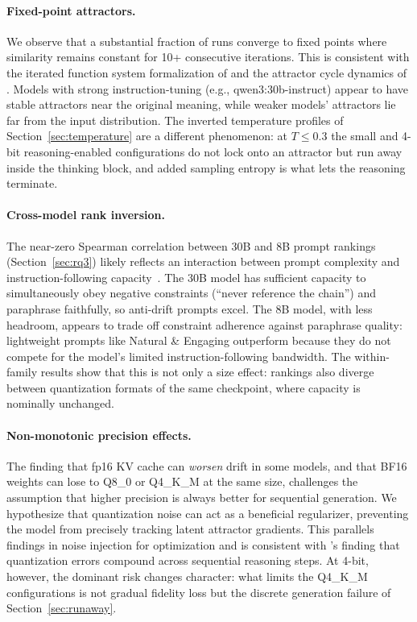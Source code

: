 \documentclass[11pt]{article}
\begin{document}
\paragraph{Fixed-point attractors.}
We observe that a substantial fraction of runs converge to fixed points where
similarity remains constant for 10+ consecutive iterations. This is consistent
with the iterated function system formalization of \citet{chytas2025concept}
and the attractor cycle dynamics of \citet{wang2025attractor}. Models with
strong instruction-tuning (e.g., qwen3:30b-instruct) appear to have stable
attractors near the original meaning, while weaker models' attractors lie
far from the input distribution. The inverted temperature profiles of
Section~\ref{sec:temperature} are a different phenomenon: at $T\leq0.3$ the
small and 4-bit reasoning-enabled configurations do not lock onto an
attractor but run away inside the thinking block, and added sampling entropy
is what lets the reasoning terminate.

\paragraph{Cross-model rank inversion.}
The near-zero Spearman correlation between 30B and 8B prompt rankings
(Section~\ref{sec:rq3}) likely reflects an interaction between prompt complexity
and instruction-following capacity~\citep{jaroslawicz2025ifscale}. The 30B model
has sufficient capacity to simultaneously obey negative constraints (``never
reference the chain'') and paraphrase faithfully, so anti-drift prompts excel.
The 8B model, with less headroom, appears to trade off constraint adherence
against paraphrase quality: lightweight prompts like Natural \& Engaging
outperform because they do not compete for the model's limited
instruction-following bandwidth. The within-family results show that this is not
only a size effect: rankings also diverge between quantization formats of the
same checkpoint, where capacity is nominally unchanged.

\paragraph{Non-monotonic precision effects.}
The finding that fp16 KV cache can \emph{worsen} drift in some models, and that
BF16 weights can lose to Q8\_0 or Q4\_K\_M at the same size, challenges the
assumption that higher precision is always better for sequential
generation. We hypothesize that quantization noise can act as a
beneficial regularizer, preventing the model from precisely tracking latent
attractor gradients. This parallels findings in noise injection for optimization
and is consistent with \citet{han2026quantization}'s finding that quantization
errors compound across sequential reasoning steps. At 4-bit, however, the
dominant risk changes character: what limits the Q4\_K\_M configurations is not
gradual fidelity loss but the discrete generation failure of
Section~\ref{sec:runaway}.
\end{document}
